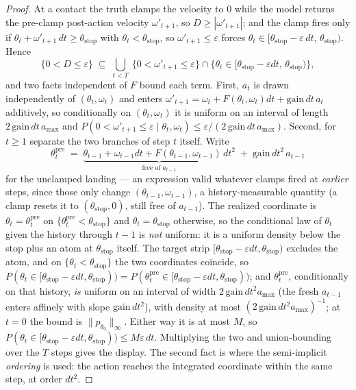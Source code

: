 \documentclass[11pt]{article}
\theoremstyle{definition}
\theoremstyle{remark}
\begin{document}
\begin{proof}
At a contact the truth clamps the velocity to $0$ while the model returns the pre-clamp post-action velocity $\omega'_{t+1}$, so $D \geq |\omega'_{t+1}|$; and the clamp fires only if $\theta_t + \omega'_{t+1}\,dt \geq \theta_{\mathrm{stop}}$ with $\theta_t < \theta_{\mathrm{stop}}$, so $\omega'_{t+1} \leq \varepsilon$ forces $\theta_t \in [\theta_{\mathrm{stop}} - \varepsilon\,dt,\, \theta_{\mathrm{stop}})$. Hence
\[
  \{0 < D \leq \varepsilon\} \;\subseteq\; \bigcup_{t < T}\ \{0 < \omega'_{t+1} \leq \varepsilon\} \cap \{\theta_t \in [\theta_{\mathrm{stop}} - \varepsilon dt,\, \theta_{\mathrm{stop}})\},
\]
and two facts independent of $F$ bound each term. First, $a_t$ is drawn independently of $(\theta_t, \omega_t)$ and enters $\omega'_{t+1} = \omega_t + F(\theta_t,\omega_t)dt + \mathrm{gain}\,dt\,a_t$ additively, so conditionally on $(\theta_t,\omega_t)$ it is uniform on an interval of length $2\,\mathrm{gain}\,dt\,a_{\max}$ and $P(0 < \omega'_{t+1} \leq \varepsilon \mid \theta_t, \omega_t) \leq \varepsilon/(2\,\mathrm{gain}\,dt\,a_{\max})$. Second, for $t \geq 1$ separate the two branches of step $t$ itself. Write
\[
  \theta^{\mathrm{pre}}_t \;=\; \underbrace{\theta_{t-1} + \omega_{t-1}dt + F(\theta_{t-1},\omega_{t-1})\,dt^2}_{\text{free of } a_{t-1}} \;+\; \mathrm{gain}\,dt^2\,a_{t-1}
\]
for the unclamped landing --- an expression valid whatever clamps fired at \emph{earlier} steps, since those only change $(\theta_{t-1}, \omega_{t-1})$, a history-measurable quantity (a clamp resets it to $(\theta_{\mathrm{stop}}, 0)$, still free of $a_{t-1}$). The realized coordinate is $\theta_t = \theta^{\mathrm{pre}}_t$ on $\{\theta^{\mathrm{pre}}_t < \theta_{\mathrm{stop}}\}$ and $\theta_t = \theta_{\mathrm{stop}}$ otherwise, so the conditional law of $\theta_t$ given the history through $t-1$ is \emph{not} uniform: it is a uniform density below the stop plus an atom at $\theta_{\mathrm{stop}}$ itself. The target strip $[\theta_{\mathrm{stop}} - \varepsilon dt, \theta_{\mathrm{stop}})$ excludes the atom, and on $\{\theta_t < \theta_{\mathrm{stop}}\}$ the two coordinates coincide, so $P(\theta_t \in [\theta_{\mathrm{stop}} - \varepsilon dt, \theta_{\mathrm{stop}})) = P(\theta^{\mathrm{pre}}_t \in [\theta_{\mathrm{stop}} - \varepsilon dt, \theta_{\mathrm{stop}}))$; and $\theta^{\mathrm{pre}}_t$, conditionally on that history, \emph{is} uniform on an interval of width $2\,\mathrm{gain}\,dt^2a_{\max}$ (the fresh $a_{t-1}$ enters affinely with slope $\mathrm{gain}\,dt^2$), with density at most $(2\,\mathrm{gain}\,dt^2a_{\max})^{-1}$; at $t = 0$ the bound is $\|p_{\theta_0}\|_\infty$. Either way it is at most $M$, so $P(\theta_t \in [\theta_{\mathrm{stop}} - \varepsilon dt, \theta_{\mathrm{stop}})) \leq M\varepsilon\,dt$. Multiplying the two and union-bounding over the $T$ steps gives the display. The second fact is where the semi-implicit \emph{ordering} is used: the action reaches the integrated coordinate within the same step, at order $dt^2$.


\end{proof}
\end{document}
